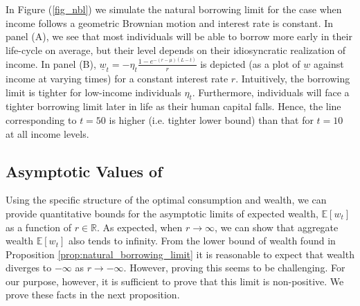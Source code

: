 \documentclass[11pt,oneside,english,reqno,dvipsnames,table]{amsart}
\numberwithin{equation}{section}
\theoremstyle{plain}
\theoremstyle{definition}
\theoremstyle{remark}
\theoremstyle{plain}
\theoremstyle{plain}
\theoremstyle{plain}
\theoremstyle{plain}
\theoremstyle{plain}
\theoremstyle{plain}
\theoremstyle{plain}
\newcommand{\EE}{\mathbb{E}}
\newcommand{\RR}{\mathbb{R}}
\numberwithin{thm}{section}
\begin{document}
%
In Figure (\ref{fig_nbl}) we simulate the natural borrowing limit for the case when income follows a geometric Brownian motion and interest rate is constant. In panel (A), we see that most individuals will be able to borrow more early in their life-cycle on average, but their level depends on their idiosyncratic realization of income. In panel (B), $\underline{w}_t = -\eta_t  \frac{1 - e^{-(r-\mu)(L-t)}}{r}$ is depicted (as a plot of $\underbar{w}$ against income at varying times) for a constant interest rate $r$. Intuitively, the borrowing limit is tighter for low-income individuals $\eta_t$. Furthermore, individuals will face a tighter borrowing limit later in life as their human capital falls. Hence, the line corresponding to $t=50$ is higher (i.e. tighter lower bound) than that for $t=10$ at all income levels.


\subsection{Asymptotic Values of \boldmath{$r\mapsto \EE[w_t(r)]$}}\label{sec:life_cycle_asymptotics}

Using the specific structure of the optimal consumption and wealth, we can provide quantitative bounds for the asymptotic limits of expected wealth, $\EE[w_t]$  as a function of $r\in \RR$. As expected, when $r\rightarrow \infty$, we can show that aggregate wealth $\EE[w_t]$ also tends to infinity. %
From the lower bound of wealth found in Proposition \ref{prop:natural_borrowing_limit} it is reasonable to expect that wealth diverges to $-\infty $ as $r\rightarrow -\infty$. However, proving this seems to be challenging. For our purpose, however, it is sufficient to prove that this  limit is non-positive. We prove these facts in the next proposition. 
\end{document}
